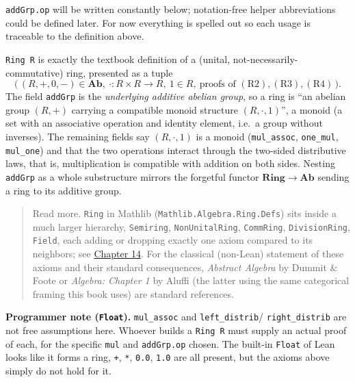 \texttt{addGrp.op} will be written constantly below; notation-free helper abbreviations could be defined later. For now everything is spelled out so each usage is traceable to the definition above.

\begin{mathreading}

\texttt{Ring R} is exactly the textbook definition of a (unital, not-necessarily-commutative) ring, presented as a tuple \[
\Big(\,(R,+,0,-)\in\mathbf{Ab},\ \cdot : R\times R\to R,\ 1\in R,\
\text{proofs of }(\mathrm{R2}),(\mathrm{R3}),(\mathrm{R4})\,\Big).
\] The field \texttt{addGrp} is the \emph{underlying additive abelian group}, so a ring is ``an abelian group \((R,+)\) carrying a compatible monoid structure \((R,\cdot,1)\)'', a monoid (a set with an associative operation and identity element, i.e.~a group without inverses). The remaining fields say \((R,\cdot,1)\) is a monoid (\texttt{mul\_\allowbreak{}assoc}, \texttt{one\_\allowbreak{}mul}, \texttt{mul\_\allowbreak{}one}) and that the two operations interact through the two-sided distributive laws, that is, multiplication is compatible with addition on both sides. Nesting \texttt{addGrp} as a whole substructure mirrors the forgetful functor \(\mathbf{Ring}\to\mathbf{Ab}\) sending a ring to its additive group.

\end{mathreading}

\begin{quote}
Read more. \texttt{Ring} in Mathlib (\texttt{Mathlib.Algebra.Ring.Defs}) sits inside a much larger hierarchy, \texttt{Semiring}, \texttt{NonUnitalRing}, \texttt{CommRing}, \texttt{DivisionRing}, \texttt{Field}, each adding or dropping exactly one axiom compared to its neighbors; see \hyperref[sec:14-next-steps:02-moving-to-mathlib:1]{Chapter 14}. For the classical (non-Lean) statement of these axioms and their standard consequences, \emph{Abstract Algebra} by Dummit \& Foote or \emph{Algebra: Chapter 1} by Aluffi (the latter using the same categorical framing this book uses) are standard references.
\end{quote}

\textbf{Programmer note (\texttt{Float}).} \texttt{mul\_\allowbreak{}assoc} and \texttt{left\_\allowbreak{}distrib}/ \texttt{right\_\allowbreak{}distrib} are not free assumptions here. Whoever builds a \texttt{Ring R} must supply an actual proof of each, for the specific \texttt{mul} and \texttt{addGrp.op} chosen. The built-in \texttt{Float} of Lean looks like it forms a ring, \texttt{+}, \texttt{*}, \texttt{0.0}, \texttt{1.0} are all present, but the axioms above simply do not hold for it.

